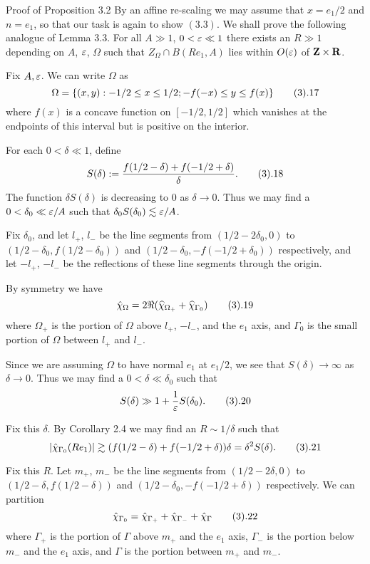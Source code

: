 \subhead Proof of Proposition 3.2 \endsubhead By an affine
re-scaling we may assume that $x = e_1/2$ and $n = e_1$, so that
our task is again to show $(3.3)$. We shall prove the following
analogue of Lemma 3.3.  For all $A \gg 1$,
$0 < \varepsilon \ll 1$ there exists an $R \gg 1$ depending on $A$,
$\varepsilon$, $\Omega$ such that $Z_\Omega \cap B(Re_1, A)$ lies
within $O(\varepsilon)$ of $\hbox{{\bf Z}} \times \hbox{{\bf R}}$. \endproclaim

 Fix $A, \varepsilon$.  We can write $\Omega$ as
$$ \Omega= \{ (x,y): -1/2 \leq x \leq 1/2; -f(-x) \leq y \leq f(x) \}
\tag3.17$$
where $f(x)$ is a concave function on $[-1/2,1/2]$ which vanishes
at the endpoints
of this interval but is positive on the interior.

For each $0<\delta \ll 1$, define
$$ S(\delta) := \frac{f(1/2 - \delta) + f(-1/2 + \delta)}{\delta}.
\tag3.18$$
The function $\delta S(\delta)$ is decreasing to 0 as $\delta
\to 0$. Thus we may find a $0 <  \delta_0 \ll \varepsilon/A$ such that
$\delta_0 S(\delta_0) \lesssim \varepsilon/A$.

Fix $\delta_0$, and let $l_+$, $l_-$ be the line segments from
$(1/2 -2\delta_0,0)$ to $(1/2-\delta_0, f(1/2-\delta_0))$ and
$(1/2-\delta_0, -f(-1/2+\delta_0))$ respectively, and let
$-l_+$, $-l_-$ be the reflections of these line segments through
the origin.

By symmetry we have
$$ \hat \chi_\Omega = 2 \Re ( \widehat{\chi}_{\Omega_+} + \widehat{\chi}_{\Gamma_0} )
\tag 3.19$$ where $\Omega_+$ is the portion of $\Omega$ above
$l_+$, $-l_-$, and the $e_1$ axis, and $\Gamma_0$ is the small
portion of $\Omega$ between $l_+$ and $l_-$.

Since we are assuming $\Omega$ to have normal $e_1$ at $e_1/2$, we see that
$S(\delta) \to \infty$ as $\delta \to 0$. Thus we may find a
$0 < \delta \ll \delta_0$ such that
$$ S(\delta) \gg 1 + \frac{1}{\eps} S(\delta_0). \tag3.20$$

Fix this $\delta$. By Corollary 2.4 we may find an
$R \sim 1/\delta$ such that
$$ |\hat \chi_{\Gamma_0}(R e_1)| \gtrsim (f(1/2 - \delta) +
f(-1/2 + \delta)) \delta = \delta^2 S(\delta). \tag 3.21$$

Fix this $R$. Let $m_+$, $m_-$ be the line segments from
$(1/2 - 2\delta, 0)$ to $(1/2 - \delta, f(1/2 - \delta))$
and $(1/2 - \delta_0, -f(-1/2 + \delta))$ respectively. We can partition
$$ \hat \chi_{\Gamma_0} = \hat \chi_{\Gamma_+} + \hat \chi_{\Gamma_-} +
\hat \chi_\Gamma \tag3.22$$ where $\Gamma_+$ is the portion of $\Gamma$ above
$m_+$ and the $e_1$ axis, $\Gamma_-$ is the portion below $m_-$ and the $e_1$
axis, and $\Gamma$ is the portion between $m_+$ and $m_-$.


